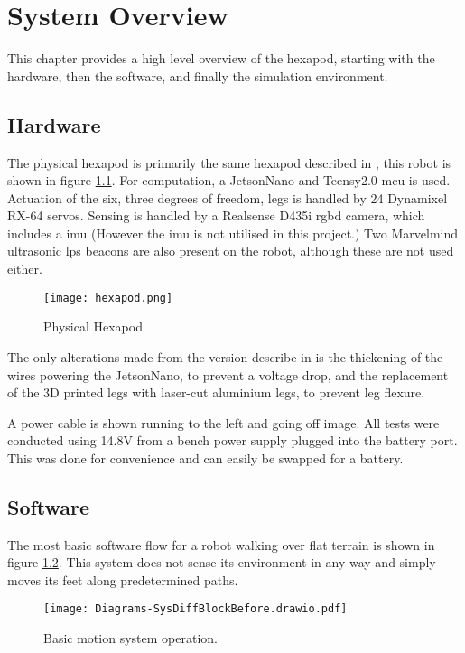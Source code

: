 \chapter{System Overview}
This chapter provides a high level overview of the hexapod, starting with the hardware, then the software, and finally the simulation
environment.
\section{Hardware}
The physical hexapod is primarily the same hexapod described in \cite{erasmus2023guidance}, this robot is shown in figure \ref{fig:hexapod}. For computation, a JetsonNano and Teensy2.0 \ac{mcu} is used. Actuation of the six, three degrees of freedom, legs is handled by 24 Dynamixel RX-64 servos. Sensing is handled by a Realsense D435i \ac{rgbd} camera, which includes a \ac{imu} (However the \ac{imu} is not utilised in this project.) Two Marvelmind ultrasonic \ac{lps} beacons are also present on the robot, although these are not used either.
\begin{figure}[h]
    \centering
    \texttt{[image: hexapod.png]}
    \caption{Physical Hexapod}
    \label{fig:hexapod}
\end{figure}

\noindent
The only alterations made from the version describe in \cite{erasmus2023guidance} is the thickening of the wires powering the JetsonNano,
to prevent a voltage drop, and the replacement of the 3D printed legs with laser-cut aluminium legs, to prevent leg flexure.

A power cable is shown running to the left and going off image. All tests were conducted using 14.8V
from a bench power supply plugged into the battery port. This was done for convenience and can easily be swapped for a battery.

\section{Software}
The most basic software flow for a robot walking over flat terrain is shown in figure \ref{fig:basic_sys}. This system does not sense
its environment in any way and simply moves its feet along predetermined paths.
\begin{figure}[h]
    \centering
    \texttt{[image: Diagrams-SysDiffBlockBefore.drawio.pdf]}
    \caption{Basic motion system operation.}
    \label{fig:basic_sys}
\end{figure}

